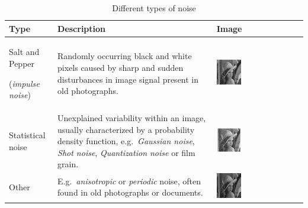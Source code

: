 \begin{table}[t]
{\small
\begin{tabular}{p{8em}p{12em}l}
\toprule
\textbf{Type} & \textbf{Description} & \textbf{Image} \\
\midrule
Salt and Pepper \par (\emph{impulse noise})
&
Randomly occurring black and white pixels caused by sharp and sudden
disturbances in image signal present in old photographs.
&
\includegraphics[width=0.3\textwidth, align=t]{img/preprocessing/noise_saltpepper.png} \\
Statistical noise 
&
Unexplained variability within an image, usually characterized by a probability density function, e.g.~\emph{Gaussian noise}, \emph{Shot noise}, \emph{Quantization noise} or film grain.
&
\includegraphics[width=0.3\textwidth, align=t]{img/preprocessing/noise_gaussian.jpg}\\
Other
&
E.g.~\emph{anisotropic} or \emph{periodic} noise, often found in old photographs or documents.
&
\includegraphics[width=0.3\textwidth, align=t]{img/preprocessing/noise_periodic.jpg} \\
\bottomrule
\end{tabular}
}
\caption{Different types of noise}
\label{tab:preprocessNoiseTypes}
\end{table}

